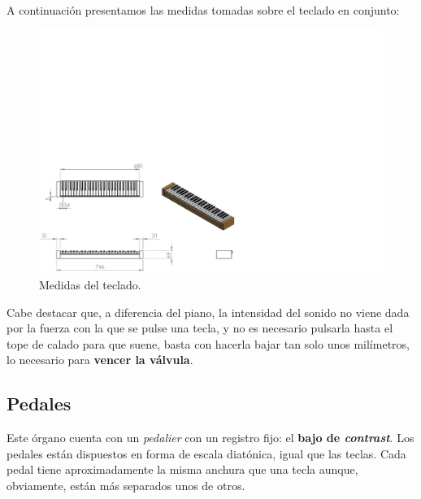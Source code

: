 \smallskip

A continuación presentamos las medidas tomadas sobre el teclado en conjunto:

\smallskip

\begin{figure}[H]
	\noindent \begin{centering}
		\includegraphics[clip=true,trim=0 0 360 320, width=\linewidth*3/4]{capitulo3/teclado_modelo}
		\par\end{centering}
	\smallskip
	\caption{\label{fig:teclado_modelo} Medidas del teclado.}
\end{figure} 

\smallskip

Cabe destacar que, a diferencia del piano, la intensidad del sonido no viene dada por la fuerza con la que se pulse una tecla, y no es necesario pulsarla hasta el tope de calado para que suene, basta con hacerla bajar tan solo unos milímetros, lo necesario para \textbf{vencer la válvula}.

\subsection{Pedales}

Este órgano cuenta con un \textit{pedalier} con un registro fijo: el \textbf{bajo de \textit{contrast}}. Los pedales están dispuestos en forma de escala diatónica, igual que las teclas. Cada pedal tiene aproximadamente la misma anchura que una tecla aunque, obviamente, están más separados unos de otros.

\smallskip

